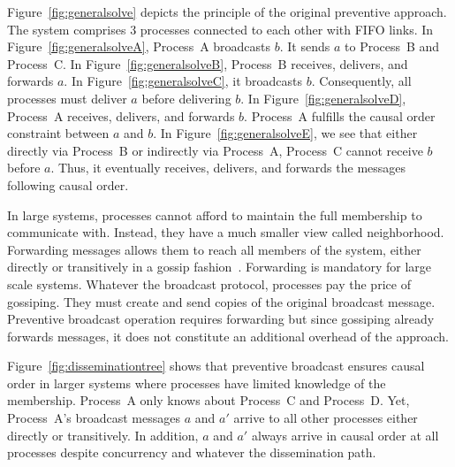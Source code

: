 Figure~\ref{fig:generalsolve} depicts the principle of the original preventive
approach. The system comprises 3 processes connected to each other with FIFO
links.  In Figure~\ref{fig:generalsolveA}, Process~A broadcasts $b$. It sends
$a$ to Process~B and Process~C. In Figure~\ref{fig:generalsolveB}, Process~B
receives, delivers, and forwards $a$. In Figure~\ref{fig:generalsolveC}, it
broadcasts $b$. Consequently, all processes must deliver $a$ before delivering
$b$. In Figure~\ref{fig:generalsolveD}, Process~A receives, delivers, and
forwards $b$. Process~A fulfills the causal order constraint between $a$ and
$b$. In Figure~\ref{fig:generalsolveE}, we see that either directly via
Process~B or indirectly via Process~A, Process~C cannot receive $b$ before
$a$. Thus, it eventually receives, delivers, and forwards the messages following
causal order.


In large systems, processes cannot afford to maintain the full membership to
communicate with. Instead, they have a much smaller view called
neighborhood. Forwarding messages allows them to reach all members of the
system, either directly or transitively in a gossip
fashion~\cite{birman1999bimodal,demers1987epidemic}. Forwarding is mandatory for
large scale systems.  Whatever the broadcast protocol, processes pay the price
of gossiping. They must create and send copies of the original broadcast
message. Preventive broadcast operation requires forwarding but since gossiping
already forwards messages, it does not constitute an additional overhead of the
approach.

Figure~\ref{fig:disseminationtree} shows that preventive broadcast ensures
causal order in larger systems where processes have limited knowledge of
the membership.  Process~A only knows about Process~C and Process~D.  Yet,
Process~A's broadcast messages $a$ and $a'$ arrive to all other processes either
directly or transitively. In addition, $a$ and $a'$ always arrive in causal
order at all processes despite concurrency and whatever the dissemination path.

